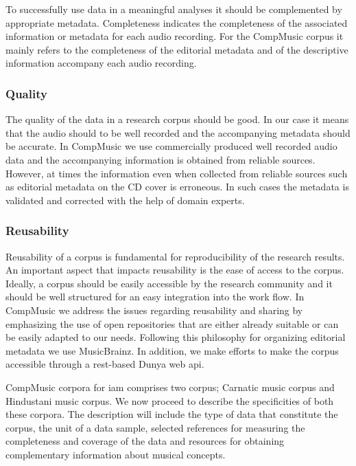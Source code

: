 To successfully use data in a meaningful analyses it should be complemented by appropriate metadata. Completeness indicates the completeness of the associated information or metadata for each audio recording. For the CompMusic corpus it mainly refers to the completeness of the editorial metadata and of the descriptive information accompany each audio recording. 

\subsubsection{Quality}

The quality of the data in a research corpus should be good. In our case it means that the audio should to be well recorded and the accompanying metadata should be accurate. In CompMusic we use commercially produced well recorded audio data and the accompanying information is obtained from reliable sources. However, at times the information even when collected from reliable sources such as editorial metadata on the CD cover is erroneous. In such cases the metadata is validated and corrected with the help of domain experts. 

\subsubsection{Reusability}

Reusability of a corpus is fundamental for reproducibility of the research results. An important aspect that impacts reusability is the ease of access to the corpus. Ideally, a corpus should be easily accessible by the research community and it should be well structured for an easy integration into the work flow. In CompMusic we address the issues regarding reusability and sharing by emphasizing the use of open repositories that are either already suitable or can be easily adapted to our needs. Following this philosophy for organizing editorial metadata we use MusicBrainz. In addition, we make efforts to make the corpus  accessible through a \acrshort{rest}-based Dunya web \gls{api}.

CompMusic corpora for \gls{iam} comprises two corpus; Carnatic music corpus and Hindustani music corpus. We now proceed to describe the specificities of both these corpora. The description will include the type of data that constitute the corpus, the unit of a data sample, selected references for measuring the completeness and coverage of the data and resources for obtaining complementary information about musical concepts. 


